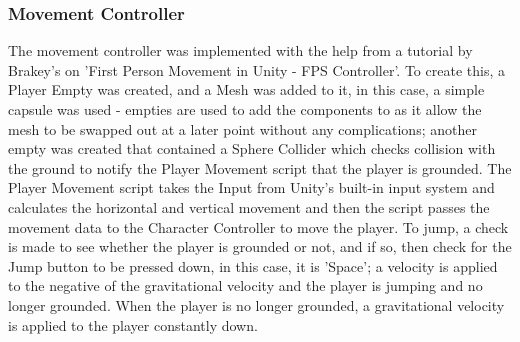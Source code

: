 \documentclass[11pt]{report}
\begin{document}
\subsubsection{Movement Controller}
The movement controller was implemented with the help from a tutorial by Brakey's on 'First Person Movement in Unity - FPS Controller'\cite{fpsController}. To create this, a Player Empty was created, and a Mesh was added to it, in this case, a simple capsule was used - empties are used to add the components to as it allow the mesh to be swapped out at a later point without any complications; another empty was created that contained a Sphere Collider which checks collision with the ground to notify the Player Movement script that the player is grounded. The Player Movement script takes the Input from Unity's built-in input system and calculates the horizontal and vertical movement and then the script passes the movement data to the Character Controller to move the player. To jump, a check is made to see whether the player is grounded or not, and if so, then check for the Jump button to be pressed down, in this case, it is 'Space'; a velocity is applied to the negative of the gravitational velocity and the player is jumping and no longer grounded. When the player is no longer grounded, a gravitational velocity is applied to the player constantly down.
\end{document}

